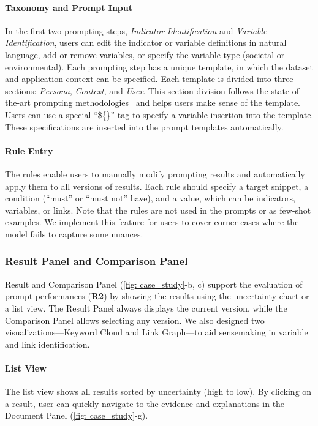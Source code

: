 \paragraph{Taxonomy and Prompt Input}
In the first two prompting steps, \textit{Indicator Identification} and \textit{Variable Identification}, users can edit the indicator or variable definitions in natural language, add or remove variables, or specify the variable type (societal or environmental). 
Each prompting step has a unique template, in which the dataset and application context can be specified. Each template is divided into three sections: \textit{Persona}, \textit{Context}, and \textit{User}. This section division follows the state-of-the-art prompting methodologies~\cite{promptengineeringuide} and helps users make sense of the template. 
Users can use a special ``\$\{\}'' tag to specify a variable insertion into the template. 
These specifications are inserted into the prompt templates automatically.

\vspace*{-0.1cm}
\paragraph{Rule Entry} The rules enable users to manually modify prompting results and automatically apply them to all versions of results. Each rule should specify a target snippet, a condition (``must'' or ``must not'' have), and a value, which can be indicators, variables, or links. Note that the rules are not used in the prompts or as few-shot examples. We implement this feature for users to cover corner cases where the model fails to capture some nuances.

\vspace*{-0.15cm}
\subsubsection{Result Panel and Comparison Panel}
Result and Comparison Panel (\autoref{fig: case_study}-b, c) support the evaluation of prompt performances (\textbf{R2}) by showing the results using the uncertainty chart or a list view.
The Result Panel always displays the current version, while the Comparison Panel allows selecting any version. We also designed two visualizations—Keyword Cloud and Link Graph—to aid sensemaking in variable and link identification.

\vspace*{-0.1cm}
\paragraph{List View}
The list view shows all results sorted by uncertainty (high to low). By clicking on a result, user can quickly navigate to the evidence and explanations in the Document Panel (\autoref{fig: case_study}-g). 

